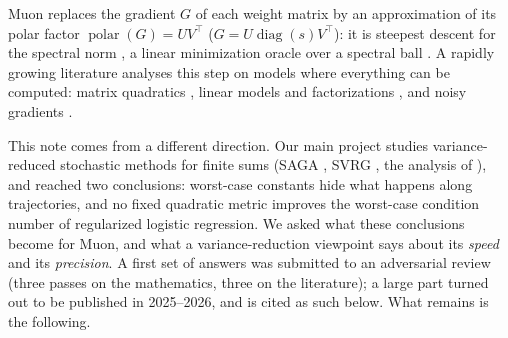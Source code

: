 \documentclass[11pt]{article}
\theoremstyle{remark}
\newcommand{\diag}{\operatorname{diag}}
\newcommand{\polar}{\operatorname{polar}}
\begin{document}
Muon \cite{jordan2024muon} replaces the gradient $G$ of each weight matrix by an approximation of its polar factor
$\polar(G)=UV^\top$ ($G=U\diag(s)V^\top$): it is steepest descent for the spectral norm
\cite{carlson2015stochastic,bernstein2024old}, a linear minimization oracle over a spectral ball
\cite{pethick2025training}. A rapidly growing literature analyses this step on models where everything can be computed:
matrix quadratics \cite{shulgin2026quadratic,jawanpuria2026constant,gonon2026insights,davis2025spectral,wang2026why},
linear models and factorizations \cite{vasudeva2025muon,ma2026preconditioning}, and noisy gradients
\cite{xie2026muon,chen2026when,paquette2026phases,do2026muon}.

This note comes from a different direction. Our main project studies variance-reduced stochastic methods for
finite sums (SAGA \cite{defazio2014saga}, SVRG \cite{johnson2013accelerating}, the analysis of \cite{bach2024learning}),
and reached two conclusions: worst-case constants hide what happens along trajectories, and no fixed quadratic metric
improves the worst-case condition number of regularized logistic regression. We asked what these conclusions become for
Muon, and what a variance-reduction viewpoint says about its \emph{speed} and its \emph{precision}. A first set of
answers was submitted to an adversarial review (three passes on the mathematics, three on the literature); a large part
turned out to be published in 2025--2026, and is cited as such below. What remains is the following.
\end{document}
